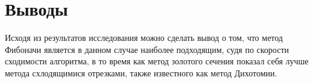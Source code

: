\documentclass[a4paper, 14pt]{extarticle}
\begin{document}
\section{Выводы}\label{Sect::task}

 Исходя из результатов исследования можно сделать вывод о том, что метод Фибоначи является в данном случае наиболее подходящим, судя по скорости сходимости алгоритма, в то время как метод золотого сечения показал себя лучше метода схлодящимися отрезками, также известного как метод Дихотомии.
\end{document}
